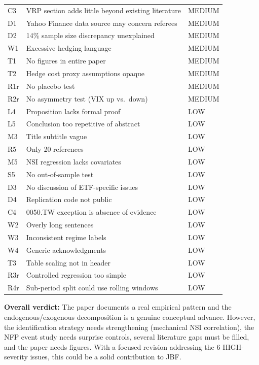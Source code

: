 \documentclass[12pt,a4paper]{article}
\begin{document}
\begin{longtable}{p{1.2cm}p{12cm}p{2cm}}
C3 & VRP section adds little beyond existing literature & \textcolor{warncolor}{MEDIUM} \\
D1 & Yahoo Finance data source may concern referees & \textcolor{warncolor}{MEDIUM} \\
D2 & 14\% sample size discrepancy unexplained & \textcolor{warncolor}{MEDIUM} \\
W1 & Excessive hedging language & \textcolor{warncolor}{MEDIUM} \\
T1 & No figures in entire paper & \textcolor{warncolor}{MEDIUM} \\
T2 & Hedge cost proxy assumptions opaque & \textcolor{warncolor}{MEDIUM} \\
R1r & No placebo test & \textcolor{warncolor}{MEDIUM} \\
R2r & No asymmetry test (VIX up vs.\ down) & \textcolor{warncolor}{MEDIUM} \\
\midrule
L4 & Proposition lacks formal proof & \textcolor{okgreen}{LOW} \\
L5 & Conclusion too repetitive of abstract & \textcolor{okgreen}{LOW} \\
M3 & Title subtitle vague & \textcolor{okgreen}{LOW} \\
R5 & Only 20 references & \textcolor{okgreen}{LOW} \\
M5 & NSI regression lacks covariates & \textcolor{okgreen}{LOW} \\
S5 & No out-of-sample test & \textcolor{okgreen}{LOW} \\
D3 & No discussion of ETF-specific issues & \textcolor{okgreen}{LOW} \\
D4 & Replication code not public & \textcolor{okgreen}{LOW} \\
C4 & 0050.TW exception is absence of evidence & \textcolor{okgreen}{LOW} \\
W2 & Overly long sentences & \textcolor{okgreen}{LOW} \\
W3 & Inconsistent regime labels & \textcolor{okgreen}{LOW} \\
W4 & Generic acknowledgments & \textcolor{okgreen}{LOW} \\
T3 & Table scaling not in header & \textcolor{okgreen}{LOW} \\
R3r & Controlled regression too simple & \textcolor{okgreen}{LOW} \\
R4r & Sub-period split could use rolling windows & \textcolor{okgreen}{LOW} \\
\bottomrule
\end{longtable}

\vspace{1em}
\noindent\textbf{Overall verdict:} The paper documents a real empirical pattern and the endogenous/exogenous decomposition is a genuine conceptual advance. However, the identification strategy needs strengthening (mechanical NSI correlation), the NFP event study needs surprise controls, several literature gaps must be filled, and the paper needs figures. With a focused revision addressing the 6 HIGH-severity issues, this could be a solid contribution to JBF.
\end{document}
